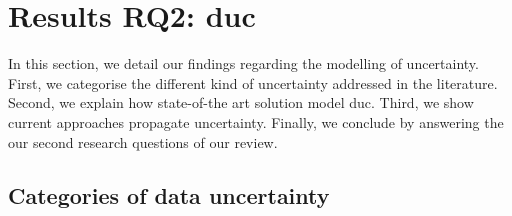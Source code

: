\section[Results RQ2: data uncertainty]{Results RQ2: \gls{duc}}
\label{sec:sota:results:duc}

In this section, we detail our findings regarding the modelling of uncertainty.
First, we categorise the different kind of uncertainty addressed in the literature.
Second, we explain how state-of-the art solution model \gls{duc}.
Third, we show current approaches propagate uncertainty.
Finally, we conclude by answering the our second research questions of our review.

\subsection{Categories of data uncertainty}

